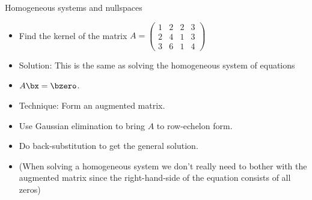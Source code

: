 \documentclass{beamer}
\begin{document}
\begin{frame}{Homogeneous systems and nullspaces}
\begin{itemize}
\item Find the kernel of the matrix
$A=
\begin{pmatrix}
1 & 2 & 2 & 3 \\
2 & 4 & 1 & 3 \\
3 & 6 & 1 & 4
\end{pmatrix}
$
\item Solution: This is the same as solving the homogeneous system of equations
\item $A\bx=\bzero$.
\item Technique: Form an augmented matrix.
\item Use Gaussian elimination to bring $A$ to row-echelon form.
\item Do back-substitution to get the general solution.
\item (When solving a homogeneous system we don't really need to bother with the
 augmented matrix since the right-hand-side
of the equation consists of all zeros)
\end{itemize}
\end{frame}
\end{document}
